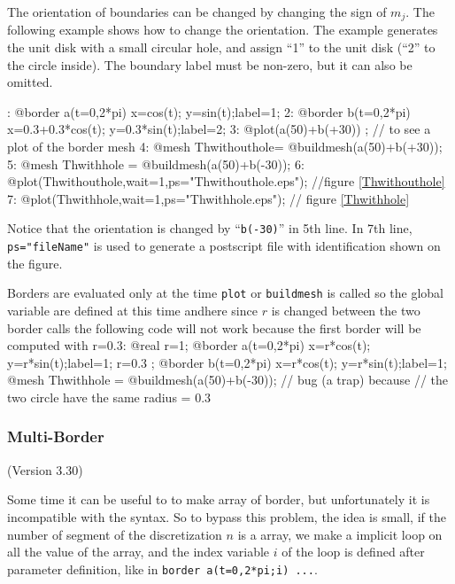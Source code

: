 \documentclass[a4paper,twoside,12pt]{book}
\def\setS#1{#1\label{sec:#1}}
\begin{document}
The orientation of boundaries can be changed by changing the sign of $m_j$.
The following example shows how to change the orientation.
The example generates the unit disk
with a small circular hole, and assign ``1'' to the unit disk
(``2'' to the circle inside).
The boundary label must be non-zero, but it can also be omitted.

: @border a(t=0,2*pi){ x=cos(t); y=sin(t);label=1;}
2: @border b(t=0,2*pi){ x=0.3+0.3*cos(t); y=0.3*sin(t);label=2;}
3: @plot(a(50)+b(+30)) ; // to see a plot of the border mesh 
4: @mesh Thwithouthole= @buildmesh(a(50)+b(+30));
5: @mesh Thwithhole   = @buildmesh(a(50)+b(-30));
6: @plot(Thwithouthole,wait=1,ps="Thwithouthole.eps"); //figure \ref{Thwithouthole}
7: @plot(Thwithhole,wait=1,ps="Thwithhole.eps"); // figure \ref{Thwithhole}
\eFF
\begin{note}
Notice that the orientation is changed by ``\texttt{b(-30)}'' in 5th line. In 7th line, \texttt{ps="fileName"} is used to generate a postscript file with identification shown on the figure.
\end{note}


\begin{note}
 Borders are evaluated only at the time \texttt{plot} or \texttt{buildmesh} is called  so
the global variable are defined  at this time andhere since $r$ is changed between the two border calls the following code will not work because the first border will be computed with r=0.3:
\bFF
   @real r=1;    @border a(t=0,2*pi){ x=r*cos(t); y=r*sin(t);label=1;}
   r=0.3    ;   @border b(t=0,2*pi){ x=r*cos(t); y=r*sin(t);label=1;}
   @mesh Thwithhole   = @buildmesh(a(50)+b(-30)); // bug (a trap) because
   // the two circle have the same radius = $0.3$
\eFF
\end{note}

\subsubsection{\setS{Multi-Border}}
(Version 3.30)

Some time it can be useful to to make array of border, but unfortunately it is incompatible with the \freefempp syntax. 
So to bypass this problem, the idea is small, if the number of segment of the discretization $n$ is a array, we make  a implicit loop on all the value of the array, and
the index variable $i$ of the loop  is defined after  parameter definition,  like in \verb!border a(t=0,2*pi;i) ...!.
\end{document}
